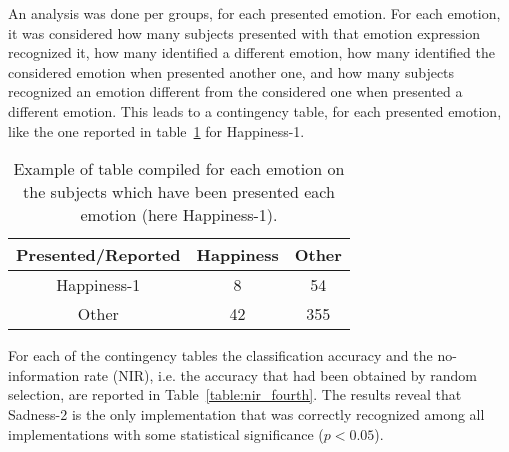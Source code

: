 An analysis was done per groups, for each presented emotion. For each emotion, it was considered how many subjects presented with that emotion expression recognized it, how many identified a different emotion, how many identified the considered emotion when presented another one, and how many subjects recognized an emotion different from the considered one when presented a different emotion. This leads to a contingency table, for each presented emotion, like the one reported in table~\ref{table:singleEmotion} for Happiness-1. 
\begin{table}[!htbp]
\begin{center}
\caption{Example of table compiled for each emotion on the subjects which have been presented each emotion (here Happiness-1).}
\label{table:singleEmotion}
\begin{tabular}{|c|c|c|}
\hline 
Presented/Reported&Happiness&Other\\
\hline 
Happiness-1&8&54\\
\hline 
Other&42&355\\
\hline
\end{tabular}
\end{center}
\end{table}

For each of the contingency tables the classification accuracy and the no-information rate (NIR), i.e. the accuracy that had been obtained by random selection, are reported in Table~\ref{table:nir_fourth}. The results reveal that Sadness-2 is the only implementation that was correctly recognized among all implementations with some statistical significance ($p<0.05$). 

